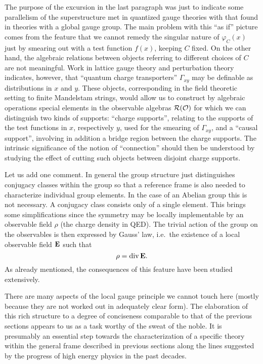 The purpose of the excursion in the last paragraph was just to
indicate some parallelism of the superstructure met in quantized gauge
theories with that found in theories with a global gauge group. 
The main problem with this
``as if'' picture comes from the feature that we cannot remedy the
singular nature of $\varphi_C (x)$ just by smearing out with a test
function $f(x)$, keeping $C$ fixed. On the other hand, the algebraic
relations between objects referring to different choices of $C$ are
not meaningful. Work in lattice gauge theory \cite{Sei} and perturbation 
theory \cite{Ste} indicates, however, that ``quantum charge 
transporters'' $\Gamma_{x  y}$ may be definable as distributions 
in $x$ and $y$. These objects, corresponding in the field theoretic
setting to finite Mandelstam strings, would allow us to construct by 
algebraic operations special elements in the observable algebras ${\cal R}({\cal O})$
for which we can distinguish two kinds of supports: ``charge supports'',
relating to the supports of the test functions in $x$, respectively
$y$, used for the smearing of 
$\Gamma_{x  y}$, and a 
``causal support'', involving in addition a bridge region between
the charge supports. The intrinsic significance of the notion of ``connection''
should then be understood by studying the effect of cutting such
objects between disjoint charge supports.

Let us add one comment. In general the group structure just
distinguishes conjugacy classes within the group so that a reference
frame is also needed to characterize individual group elements. In the
case of an Abelian group this is not necessary. A conjugacy class
consists only of a single element. This brings some
simplifications since the symmetry may be locally implementable
by an observable field $\rho$ (the charge density
in QED). The trivial action of the group on the observables is then
expressed by Gauss' law, i.e.\ the existence of a local observable
field ${\bf E}$ such that 
\begin{equation}
\rho = \mbox{div} \, {\bf E}.
\end{equation}
As already mentioned, the consequences of this feature have been
studied extensively.

There are many aspects of the local gauge principle we cannot touch here 
(mostly because they are not worked out in adequately clear form). The
elaboration of this rich structure to a degree of conciseness
comparable to that of the previous sections appears to us as a task
worthy of the sweat of the noble. It is presumably an essential step
towards the characterization of a specific theory within the general
frame described in previous sections along the lines suggested by the
progress of high energy physics in the past decades. 

